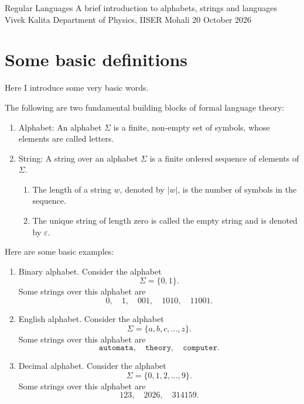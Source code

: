 \documentclass[10pt,a4paper]{article}
\begin{document}
\makemathtitle
    {Regular Languages}
    {A brief introduction to alphabets, strings and languages}
    {Vivek Kalita}
    {Department of Physics, IISER Mohali}
    {20 October 2026}

\tableofcontents

\section{Some basic definitions}

Here I introduce some very basic words.
\begin{definition}
The following are two fundamental building blocks of formal language theory:
\begin{enumerate}
    \item \textcolor{red!60!black}{\textsf{Alphabet}}: An alphabet $\Sigma$ is a finite, non-empty set of symbols, whose elements are called letters.
    \item \textcolor{red!60!black}{\textsf{String}}: A string over an alphabet $\Sigma$ is a finite ordered sequence of elements of $\Sigma$. 
    \begin{enumerate}
        \item The length of a string $w$, denoted by $|w|$, is the number of symbols in the sequence.
        \item The unique string of length zero is called the empty string and is denoted by $\varepsilon$.
    \end{enumerate}
     
\end{enumerate}
\end{definition}
Here are some basic examples: 
\begin{enumerate}
    \item \textcolor{violet!80!black}{\textsf{Binary alphabet.}} Consider the alphabet
    \[
        \Sigma = \{0,1\}.
    \]
    Some strings over this alphabet are
    \[
        0,\quad 1,\quad 001,\quad 1010,\quad 11001.
    \]

    \item \textcolor{violet!80!black}{\textsf{English alphabet.}} Consider the alphabet
    \[
        \Sigma = \{a,b,c,\ldots,z\}.
    \]
    Some strings over this alphabet are
    \[
        \texttt{automata},\quad
        \texttt{theory},\quad
        \texttt{computer}.
    \]

    \item \textcolor{violet!80!black}{\textsf{Decimal alphabet.}} Consider the alphabet
    \[
        \Sigma = \{0,1,2,\ldots,9\}.
    \]
    Some strings over this alphabet are
    \[
        123,\quad 2026,\quad 314159.
    \]
\end{enumerate}
\end{document}
